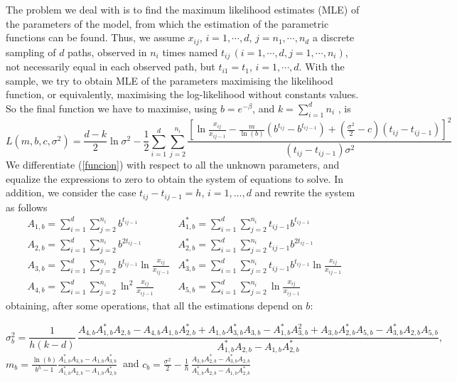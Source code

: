 \documentclass{sig-alternate}
\begin{document}
The problem we deal with is to find the maximum likelihood estimates (MLE) of the parameters of the model, from which the estimation of the parametric functions can be found. Thus, we assume $x_{ij}$, $i=1,\cdots,d$, $j=n_1, \cdots, n_d$ a discrete sampling of $d$ paths, observed in $n_i$ times named $t_{ij}\,(i=1,\cdots,d,j=1,\cdots,n_i )$, not necessarily equal in each observed path, but $t_{i1}=t_{1}$, $i=1,\cdots, d$. With the sample, we try to obtain MLE of the parameters maximising the likelihood function, or equivalently, maximising the log-likelihood without constants values. So the final function we have to maximise, using $b=e^{-\beta}$, and $k=\sum_{i=1}^d n_i$ , is
\begin{equation}\label{funcion}
L(m,b,c,\sigma^2)=\frac{d-k}{2}\ln\sigma^2
-\frac{1}{2}\sum_{i=1}^d\sum_{j=2}^{n_i}\frac{\left[\ln\frac{x_{ij}}{x_{ij-1}}-
    \frac{m}{\ln(b)} \left(b^{t_{ij}}-b^{t_{ij-1}}\right)+\left(\frac{\sigma^2}{2}-c\right)(t_{ij}-t_{ij-1})\right]^2}
    {(t_{ij}-t_{ij-1})\sigma^2}
\end{equation}
We differentiate (\ref{funcion}) with respect to all the unknown parameters, and equalize the expressions to zero to obtain the system of equations to solve. In addition, we consider the case $t_{ij}-t_{ij-1}=h$, $i=1,\ldots,d$ and rewrite the system as follows
\[
\begin{array}{ll}
    A_{1,b}=\displaystyle\sum_{i=1}^{d}\displaystyle\sum_{j=2}^{n_i}b^{t_{ij-1}}&
    A^*_{1,b}=\displaystyle\sum_{i=1}^{d}\displaystyle\sum_{j=2}^{n_i}t_{ij-1}b^{t_{ij-1}} \\
    A_{2,b}=\displaystyle\sum_{i=1}^{d}\displaystyle\sum_{j=2}^{n_i}b^{2t_{ij-1}}&
    A^*_{2,b}=\displaystyle\sum_{i=1}^{d}\displaystyle\sum_{j=2}^{n_i}t_{ij-1}b^{2t_{ij-1}}\\
    A_{3,b}=\displaystyle\sum_{i=1}^{d}\displaystyle\sum_{j=2}^{n_i}b^{t_{ij-1}}
    \ln\displaystyle\frac{x_{ij}}{x_{ij-1}} &
    A^*_{3,b}=\displaystyle\sum_{i=1}^{d}\displaystyle\sum_{j=2}^{n_i}t_{ij-1}b^{t_{ij-1}}
  \ln\displaystyle\frac{x_{ij}}{x_{ij-1}}\\
  A_{4,b}=\displaystyle\sum_{i=1}^{d}\displaystyle\sum_{j=2}^{n_i}\ln^2\displaystyle\frac{x_{ij}}{x_{ij-1}} & A_{5,b}=\displaystyle\sum_{i=1}^{d}\displaystyle\sum_{j=2}^{n_i}\ln\displaystyle\frac{x_{ij}}{x_{ij-1}}
\end{array}
\]
obtaining, after some operations, that all the estimations depend on $b$:



\noindent
{\scriptsize
\begin{equation}
\sigma_b^2=\frac{1}{h(k-d)}\,\frac{A_{4,b}A^*_{1,b}A_{2,b}-A_{4,b}A_{1,b}A^*_{2,b}+A_{1,b}A^*_{3,b}A_{3,b}-A^*_{1,b}A^2_{3,b}+
    A_{3,b}A^*_{2,b}A_{5,b}-A^*_{3,b}A_{2,b}A_{5,b}}{A^*_{1,b}A_{2,b}-A_{1,b}A^*_{2,b}},
\label{estima}
\end{equation}
}
\noindent $
    m_b= \frac{\ln(b)}{b^h-1}\frac{A^*_{1,b}A_{3,b}- A_{1,b}A^*_{3,b}}{A^*_{1,b}A_{2,b}-A_{1,b}A^*_{2,b}}\
$
and
$
    c_b=\frac{\sigma^2}{2}-\frac{1}{h}\,\frac{A_{3,b}A^*_{2,b}-A^*_{3,b}A_{2,b}}{A^*_{1,b}A_{2,b}-A_{1,b}A^*_{2,b}}
$
\end{document}
